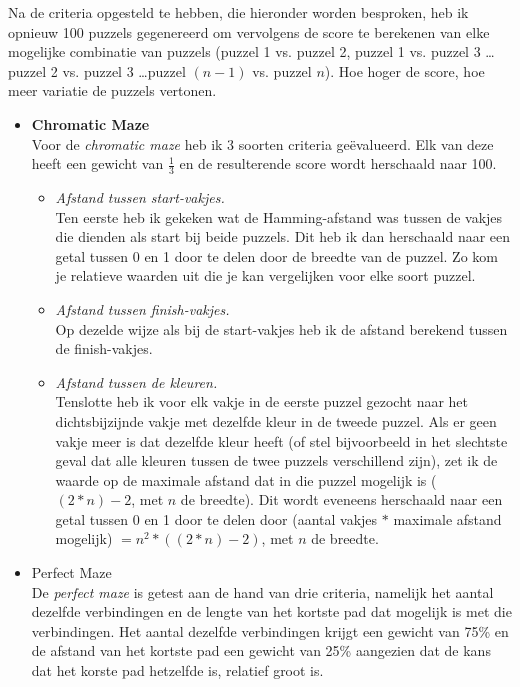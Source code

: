 \documentclass{article}
\begin{document}
Na de criteria opgesteld te hebben, die hieronder worden besproken, heb ik opnieuw 100 puzzels gegenereerd om vervolgens de score te berekenen van elke mogelijke combinatie van puzzels (puzzel 1 vs. puzzel 2, puzzel 1 vs. puzzel 3 \dots puzzel 2 vs. puzzel 3 \dots puzzel $(n-1)$ vs. puzzel $n$). Hoe hoger de score, hoe meer variatie de puzzels vertonen.
\begin{itemize}
\item \textbf{Chromatic Maze}\\
Voor de \textit{chromatic maze} heb ik 3 soorten criteria ge\"evalueerd. Elk van deze heeft een gewicht van $\frac{1}{3}$ en de resulterende score wordt herschaald naar 100.
\begin{itemize}
\item \textit{Afstand tussen start-vakjes.}\\
Ten eerste heb ik gekeken wat de Hamming-afstand was tussen de vakjes die dienden als start bij beide puzzels. Dit heb ik dan herschaald naar een getal tussen 0 en 1 door te delen door de breedte van de puzzel. Zo kom je relatieve waarden uit die je kan vergelijken voor elke soort puzzel.
\item \textit{Afstand tussen finish-vakjes.}\\
Op dezelde wijze als bij de start-vakjes heb ik de afstand berekend tussen de finish-vakjes.\item \textit{Afstand tussen de kleuren.}\\
Tenslotte heb ik voor elk vakje in de eerste puzzel gezocht naar het dichtsbijzijnde vakje met dezelfde kleur in de tweede puzzel. Als er geen vakje meer is dat dezelfde kleur heeft (of stel bijvoorbeeld in het slechtste geval dat alle kleuren tussen de twee puzzels verschillend zijn), zet ik de waarde op de maximale afstand dat in die puzzel mogelijk is ($(2*n)-2$, met $n$ de breedte). Dit wordt eveneens herschaald naar een getal tussen 0 en 1 door te delen door (aantal vakjes $*$ maximale afstand mogelijk) $= n^2 * ((2*n)-2)$, met $n$ de breedte.
\end{itemize}
\item Perfect Maze\\
De \textit{perfect maze} is getest aan de hand van drie criteria, namelijk het aantal dezelfde verbindingen en de lengte van het kortste pad dat mogelijk is met die verbindingen. Het aantal dezelfde verbindingen krijgt een gewicht van 75\% en de afstand van het kortste pad een gewicht van 25\% aangezien dat de kans dat het korste pad hetzelfde is, relatief groot is.
\begin{itemize}

\end{itemize}
\end{itemize}
\end{document}

